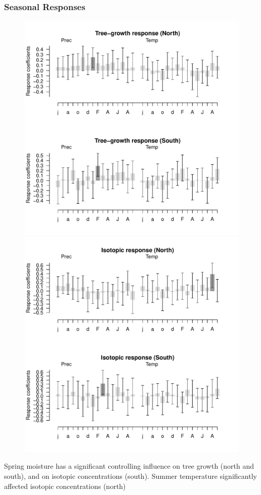 \documentclass{beamer}
\begin{document}
\begin{frame}
\frametitle{Seasonal Responses}
\begin{figure}
\begin{minipage}[b]{0.4\textwidth}
\includegraphics[width = \textwidth]{GrowthFunRes}
\end{minipage}
\begin{minipage}[b]{0.4\textwidth}
\includegraphics[width = \textwidth]{IsoFunRes}
\end{minipage}
\end{figure}
Spring moisture has a significant controlling influence on tree growth
(north and south), and on isotopic concentrations (south). Summer
temperature significantly affected isotopic concentrations (north)
\end{frame}
\end{document}
